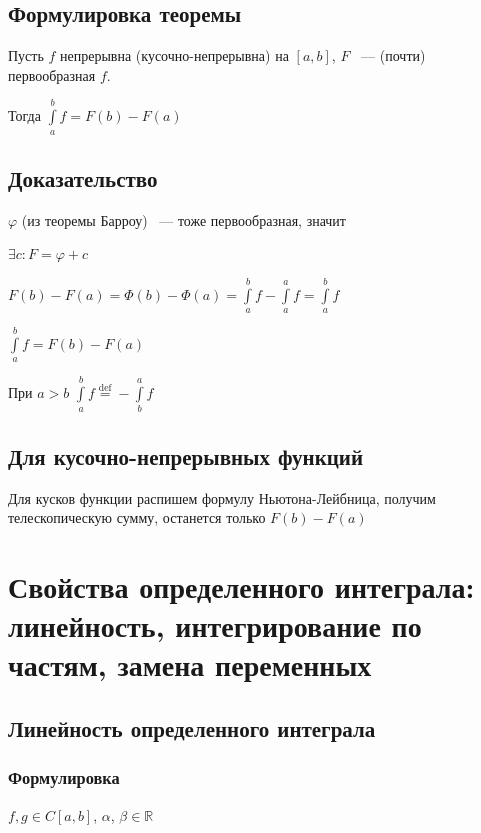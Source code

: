\documentclass{article}
\begin{document}
		\subsection{Формулировка теоремы}
		
			Пусть $f$ непрерывна (кусочно-непрерывна) на $[a, b]$, $F$ ~--- (почти) первообразная $f$. 
		
			Тогда $\int\limits^b_a f = F(b) - F(a)$
		
		\subsection{Доказательство}
		
			$\varphi$ (из теоремы Барроу) ~--- тоже первообразная, значит
			
			$\exists c : F = \varphi + c$
			
			$F(b) - F(a) = \Phi(b) - \Phi(a) = \int\limits^b_a f - \int\limits^a_a f = \int\limits^b_a f$
			
			$\int\limits^b_a f = F(b) - F(a)$
			
			При $a > b$ $\int\limits^b_a f \stackrel{\mathrm{def}}{=} - \int\limits^a_b f$
			
        \subsection{Для кусочно-непрерывных функций}
        
            Для кусков функции распишем формулу Ньютона-Лейбница, получим телескопическую сумму, останется только $F(b) - F(a)$
            
	\newpage
	
	\section{Свойства определенного интеграла: линейность, интегрирование по частям, замена переменных}
	
		\subsection{Линейность определенного интеграла}
		
			\subsubsection{Формулировка}
			
                $f, g \in C[a, b]$, $\alpha$, $\beta \in \mathbb{R}$
			
\end{document}
